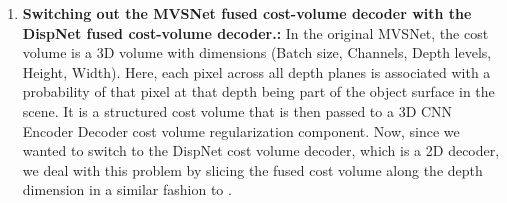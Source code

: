 \begin{enumerate}
    \item \textbf{Switching out the MVSNet fused cost-volume decoder with the DispNet fused cost-volume decoder.:} In the original MVSNet, the cost volume is a 3D volume with dimensions (Batch size, Channels, Depth levels, Height, Width). Here, each pixel across all depth planes is associated with a probability of that pixel at that depth being part of the object surface in the scene. It is a structured cost volume that is then passed to a 3D CNN Encoder Decoder cost volume regularization component. Now, since we wanted to switch to the DispNet cost volume decoder, which is a 2D decoder, we deal with this problem by slicing the fused cost volume along the depth dimension in a similar fashion to \cite{Yao2019}. \par
    

\end{enumerate}
